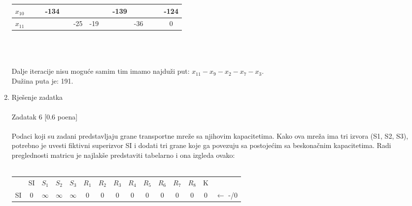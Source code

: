 \documentclass[12pt]{article}
\begin{document}
\begin{enumerate}
\begin{tabular}{|c|c|c|c|c|c|c|c|c|c|c|c|c|}
$x_{10}$ & {\color[HTML]{000000} }    & {\color[HTML]{000000} }     & {\color[HTML]{000000} -134} & {\color[HTML]{000000} }    & {\color[HTML]{000000} }    & {\color[HTML]{000000} }    & {\color[HTML]{000000} }     & {\color[HTML]{000000} -139} & {\color[HTML]{000000} }    & {\color[HTML]{000000} }     & {\color[HTML]{000000} }  & {\color[HTML]{000000} -124}      \\ \hline
$x_{11}$ & {\color[HTML]{000000} }    & {\color[HTML]{000000} }     & {\color[HTML]{000000} }     & {\color[HTML]{000000} }    & {\color[HTML]{000000} -25} & {\color[HTML]{000000} -19} & {\color[HTML]{000000} }     & {\color[HTML]{000000} }     & {\color[HTML]{000000} -36} & {\color[HTML]{000000} }     & {\color[HTML]{000000} }  & 0                                \\ \hline
\end{tabular}
\\
\\
\\
Dalje iteracije nisu moguće samim tim imamo najduži put: $x_{11} - x_9 - x_2 - x_7 - x_3$. \\
Dužina puta je: 191.
\\
\newpage
\item Rješenje zadatka \\
\\
Zadatak 6 [0.6 poena] \\
\\
Podaci koji su zadani predstavljaju grane transportne mreže sa njihovim kapacitetima. Kako ova
mreža ima tri izvora (S1, S2, S3), potrebno je uvesti fiktivni superizvor SI i dodati tri grane koje ga
povezuju sa postojećim sa beskonačnim kapacitetima. Radi preglednosti matricu je najlakše
predstaviti tabelarno i ona izgleda ovako:
\\
\\
\begin{tabular}{|c|c|c|c|c|c|c|c|c|c|c|c|c|c|l}
\cline{1-14}
      & SI & $S_1$                           & $S_2$                           & $S_3$                           & $R_1$                      & $R_2$                      & $R_3$                      & $R_4$                     & $R_5$                      & $R_6$                      & $R_7$                      & $R_8$                      & K                          &                        \\ \cline{1-14}
SI    & 0  & {\color[HTML]{000000} $\infty$} & {\color[HTML]{FE0000} $\infty$} & {\color[HTML]{000000} $\infty$} & {\color[HTML]{000000} 0}   & {\color[HTML]{000000} 0}   & {\color[HTML]{000000} 0}   & {\color[HTML]{000000} 0}  & {\color[HTML]{000000} 0}   & {\color[HTML]{000000} 0}   & {\color[HTML]{000000} 0}   & {\color[HTML]{000000} 0}   & {\color[HTML]{000000} 0}   & ${\leftarrow}$ -/0     \\ \cline{1-14}

\end{tabular}
\end{enumerate}
\end{document}
